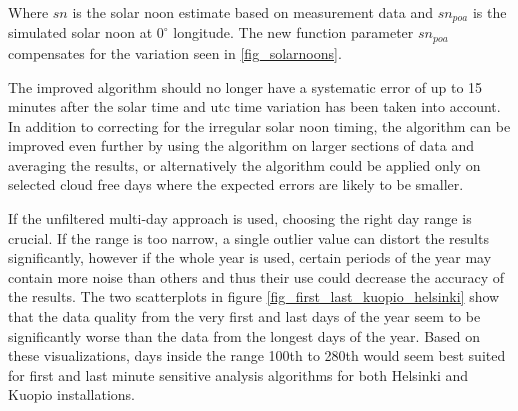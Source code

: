 \noindent Where $sn$ is the solar noon estimate based on measurement data and $sn_{poa}$ is the simulated solar noon at $0^\circ$ longitude. The new function parameter $sn_{poa}$ compensates for the variation seen in \ref{fig_solarnoons}.



\vspace{5mm}


\noindent



\vspace{0.5cm}
\noindent The improved algorithm should no longer have a systematic error of up to 15 minutes after the solar time and utc time variation has been taken into account. In addition to correcting for the irregular solar noon timing, the algorithm can be improved even further by using the algorithm on larger sections of data and averaging the results, or alternatively the algorithm could be applied only on selected cloud free days where the expected errors are likely to be smaller. 

If the unfiltered multi-day approach is used, choosing the right day range is crucial. If the range is too narrow, a single outlier value can distort the results significantly, however if the whole year is used, certain periods of the year may contain more noise than others and thus their use could decrease the accuracy of the results. The two scatterplots in figure \ref{fig_first_last_kuopio_helsinki} show that the data quality from the very first and last days of the year seem to be significantly worse than the data from the longest days of the year. Based on these visualizations, days inside the range 100th to 280th would seem best suited for first and last minute sensitive analysis algorithms for both Helsinki and Kuopio installations.



